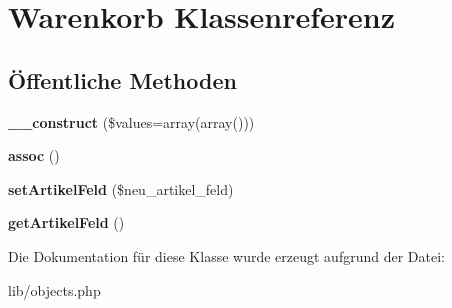 \hypertarget{classWarenkorb}{\section{\-Warenkorb \-Klassenreferenz}
\label{classWarenkorb}
}
\subsection*{Öffentliche \-Methoden}
\begin{DoxyCompactItemize}
\item 
\hypertarget{classWarenkorb_ada520aa46f7a0c8128c681e7769df763}{{\bfseries \-\_\-\-\_\-construct} (\$values=array(array()))}\label{classWarenkorb_ada520aa46f7a0c8128c681e7769df763}

\item 
\hypertarget{classWarenkorb_a4397c99a3a18b1851aaa517f88025e2b}{{\bfseries assoc} ()}\label{classWarenkorb_a4397c99a3a18b1851aaa517f88025e2b}

\item 
\hypertarget{classWarenkorb_ad2f4c6f92ce600725ddea544a5f219c5}{{\bfseries set\-Artikel\-Feld} (\$neu\-\_\-artikel\-\_\-feld)}\label{classWarenkorb_ad2f4c6f92ce600725ddea544a5f219c5}

\item 
\hypertarget{classWarenkorb_af18c96f0229f43bbeed4800a5c834172}{{\bfseries get\-Artikel\-Feld} ()}\label{classWarenkorb_af18c96f0229f43bbeed4800a5c834172}

\end{DoxyCompactItemize}


\-Die \-Dokumentation für diese \-Klasse wurde erzeugt aufgrund der \-Datei\-:\begin{DoxyCompactItemize}
\item 
lib/objects.\-php\end{DoxyCompactItemize}
